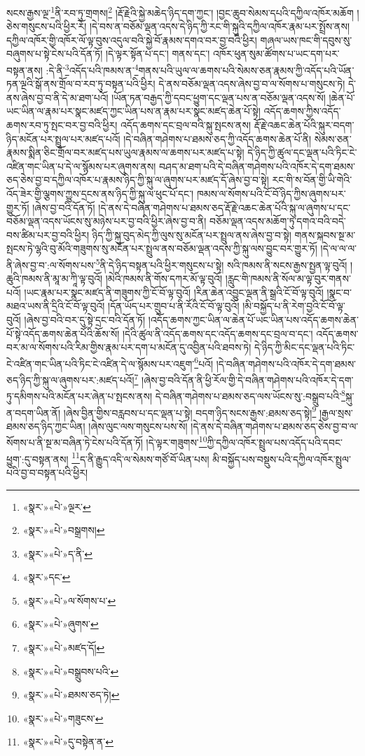 སངས་རྒྱས་ལྔ་\footnote{«སྣར་»«པེ་»ལྔར་}ནི་རབ་ཏུ་གྲགས།\footnote{«སྣར་»«པེ་»བསྒྲགས།} །རྡོ་རྗེའི་སྐྱེ་མཆེད་ཉིད་དག་ཀྱང་། །བྱང་ཆུབ་སེམས་དཔའི་དཀྱིལ་འཁོར་མཆོག །ཅེས་གསུངས་པའི་ཕྱིར་རོ། །དེ་བས་ན་བཅོམ་ལྡན་འདས་དེ་ཉིད་ཀྱི་རང་གི་སྐུའི་དཀྱིལ་འཁོར་རྣམ་པར་སྤྲོས་ནས། དཀྱིལ་འཁོར་གྱི་འཁོར་ལོ་ལྟ་བུས་འདུལ་བའི་སྐྱེ་བོ་རྣམས་དགའ་བར་བྱ་བའི་ཕྱིར། གཞལ་ཡས་ཁང་གི་དབུས་སུ་བཞུགས་པ་སྟེ་ངེས་པའི་དོན་ཏོ། །དེ་ལྟར་སྟོན་པ་དང་། གནས་དང་། འཁོར་ཕུན་སུམ་ཚོགས་པ་ཡང་དག་པར་བསྟན་ནས། :དེ་ནི་\footnote{«སྣར་»«པེ་»ད་ནི་}འདོད་པའི་ཁམས་ན་\footnote{«སྣར་»དང་}གནས་པའི་ཡུལ་ལ་ཆགས་པའི་སེམས་ཅན་རྣམས་ཀྱི་འདོད་པའི་ཡོན་ཏན་ལྔའི་སྒོ་ནས་གྲོལ་བ་རབ་ཏུ་བསྟན་པའི་ཕྱིར། དེ་ནས་བཅོམ་ལྡན་འདས་ཞེས་བྱ་བ་ལ་སོགས་པ་གསུངས་ཏེ། དེ་ནས་ཞེས་བྱ་བ་ནི་དེ་མ་ཐག་པའོ། །ཡོན་ཏན་བརྒྱད་ཀྱི་དབང་ཕྱུག་དང་ལྡན་པས་ན་བཅོམ་ལྡན་འདས་སོ། །ཆེན་པོ་ཡང་ཡིན་ལ་རྣམ་པར་སྣང་མཛད་ཀྱང་ཡིན་པས་ན་རྣམ་པར་སྣང་མཛད་ཆེན་པོ་སྟེ། འདོད་ཆགས་ཀྱིས་འདོད་ཆགས་རབ་ཏུ་སྤང་བར་བྱ་བའི་ཕྱིར། འདོད་ཆགས་དང་བྲལ་བའི་སྐུ་སྤངས་ནས། རྡོ་རྗེ་འཆང་ཆེན་པོའི་སྐུར་བདག་ཉིད་མངོན་པར་སྤྲུལ་པར་མཛད་པའོ། །དེ་བཞིན་གཤེགས་པ་ཐམས་ཅད་ཀྱི་འདོད་ཆགས་ཆེན་པོ་ནི། སེམས་ཅན་རྣམས་སྨིན་ཅིང་གྲོལ་བར་མཛད་པས་ཡུལ་རྣམས་ལ་ཆགས་པར་མཛད་པ་སྟེ། དེ་ཉིད་ཀྱི་ཚུལ་དང་ལྡན་པའི་ཏིང་ངེ་འཛིན་གང་ཡིན་པ་དེ་ལ་སྙོམས་པར་ཞུགས་ནས། བཤད་མ་ཐག་པའི་དེ་བཞིན་གཤེགས་པའི་འཁོར་དེ་དག་ཐམས་ཅད་ཅེས་བྱ་བ་དཀྱིལ་འཁོར་པ་རྣམས་ཉིད་ཀྱི་སྐུ་ལ་ཞུགས་པར་མཛད་དོ་ཞེས་བྱ་བ་སྟེ། རང་གི་ས་བོན་གྱི་ཡི་གེའི་འོད་ཟེར་གྱི་ལྕགས་ཀྱུས་དྲངས་ནས་ཉིད་ཀྱི་སྐུ་ལ་ཕུང་པོ་དང་། ཁམས་ལ་སོགས་པའི་ངོ་བོ་ཉིད་ཀྱིས་ཞུགས་པར་གྱུར་ཏོ། །ཞེས་བྱ་བའི་དོན་ཏོ། །དེ་ནས་དེ་བཞིན་གཤེགས་པ་ཐམས་ཅད་རྡོ་རྗེ་འཆང་ཆེན་པོའི་སྐུ་ལ་ཞུགས་པ་དང་བཅོམ་ལྡན་འདས་ཡོངས་སུ་མཉེས་པར་བྱ་བའི་ཕྱིར་ཞེས་བྱ་བ་ནི། བཅོམ་ལྡན་འདས་མཆོག་ཏུ་དགའ་བའི་བདེ་བས་ཚིམ་པར་བྱ་བའི་ཕྱིར། ཉིད་ཀྱི་སྐུ་བུད་མེད་ཀྱི་ལུས་སུ་མངོན་པར་སྤྲུལ་ནས་ཞེས་བྱ་བ་སྟེ། གནས་སྐབས་སྔ་མ་སྤངས་ཏེ་ལྷའི་བུ་མོའི་གཟུགས་སུ་མངོན་པར་སྤྲུལ་ནས་བཅོམ་ལྡན་འདས་ཀྱི་སྐུ་ལས་བྱུང་བར་གྱུར་ཏོ། །དེ་ལ་ལ་ལ་ནི་ཞེས་བྱ་བ་:ལ་སོགས་པས་\footnote{«སྣར་»«པེ་»ལ་སོགས་པ་}ནི་དེ་ཉིད་བསྟན་པའི་ཕྱིར་གསུངས་པ་སྟེ། སའི་ཁམས་ནི་སངས་རྒྱས་སྤྱན་ལྟ་བུའོ། །ཆུའི་ཁམས་ནི་མཱ་མ་ཀཱི་ལྟ་བུའོ། །མེའི་ཁམས་ནི་གོས་དཀར་མོ་ལྟ་བུའོ། །རླུང་གི་ཁམས་ནི་སོལ་མ་ལྟ་བུར་གནས་པའོ། །ཡང་རྣམ་པར་སྣང་མཛད་ནི་གཟུགས་ཀྱི་ངོ་བོ་ལྟ་བུའོ། །རིན་ཆེན་འབྱུང་ལྡན་ནི་སྒྲའི་ངོ་བོ་ལྟ་བུའོ། །སྣང་བ་མཐའ་ཡས་ནི་དྲིའི་ངོ་བོ་ལྟ་བུའོ། །དོན་ཡོད་པར་གྲུབ་པ་ནི་རོའི་ངོ་བོ་ལྟ་བུའོ། །མི་བསྐྱོད་པ་ནི་རེག་བྱའི་ངོ་བོ་ལྟ་བུའོ། །ཞེས་བྱ་བའི་བར་དུ་སྟེ་དྲང་བའི་དོན་ཏོ། །འདོད་ཆགས་ཀྱང་ཡིན་ལ་ཆེན་པོ་ཡང་ཡིན་པས་འདོད་ཆགས་ཆེན་པོ་སྟེ་འདོད་ཆགས་ཆེན་པོའི་ཆོས་སོ། །དེའི་ཚུལ་ནི་འདོད་ཆགས་དང་འདོད་ཆགས་དང་བྲལ་བ་དང་། འདོད་ཆགས་བར་མ་ལ་སོགས་པའི་རིམ་གྱིས་རྣམ་པར་དག་པ་མངོན་དུ་འབྱིན་པའི་ཐབས་ཏེ། དེ་ཉིད་ཀྱི་མིང་དང་ལྡན་པའི་ཏིང་ངེ་འཛིན་གང་ཡིན་པའི་ཏིང་ངེ་འཛིན་དེ་ལ་སྙོམས་པར་འཇུག་\footnote{«སྣར་»«པེ་»ཞུགས་}པའོ། །དེ་བཞིན་གཤེགས་པའི་འཁོར་དེ་དག་ཐམས་ཅད་ཉིད་ཀྱི་སྐུ་ལ་ཞུགས་པར་:མཛད་པའོ།\footnote{«སྣར་»«པེ་»མཛད་དོ།} །ཞེས་བྱ་བའི་དོན་ནི་ཕྱི་རོལ་གྱི་དེ་བཞིན་གཤེགས་པའི་འཁོར་དེ་དག་ཏུ་དམིགས་པའི་མངོན་པར་ཞེན་པ་སྤངས་ནས། དེ་བཞིན་གཤེགས་པ་ཐམས་ཅད་ལས་ཡོངས་སུ་:བསྒྲུབ་པའི་\footnote{«སྣར་»«པེ་»བསྒྲུབས་པའི་}སྐུ་ན་བདག་ཡིན་ནོ། །ཞེས་བྱིན་གྱིས་བརླབས་པ་དང་ལྡན་པ་སྟེ། བདག་ཉིད་སངས་རྒྱས་:ཐམས་ཅད་སྟེ།\footnote{«སྣར་»«པེ་»ཐམས་ཅད་ཏེ།} །རྒྱལ་སྲས་ཐམས་ཅད་ཉིད་ཀྱང་ཡིན། །ཞེས་ལུང་ལས་གསུངས་པས་སོ། །དེ་ནས་དེ་བཞིན་གཤེགས་པ་ཐམས་ཅད་ཅེས་བྱ་བ་ལ་སོགས་པ་ནི་སྔ་མ་བཞིན་ཏེ་ངེས་པའི་དོན་ཏོ། །དེ་ལྟར་གཟུགས་\footnote{«སྣར་»«པེ་»གཟུངས་}ཀྱི་དཀྱིལ་འཁོར་སྤྲུལ་པས་འདོད་པའི་དབང་ཕྱུག་:དུ་བསྟན་ནས། \footnote{«སྣར་»«པེ་»དུ་བསྟེན་ན་}ད་ནི་རྒྱུད་འདི་ལ་སེམས་གཙོ་བོ་ཡིན་པས། མི་བསྐྱོད་པས་བསྡུས་པའི་དཀྱིལ་འཁོར་སྤྲུལ་པའི་བྱ་བ་བསྟན་པའི་ཕྱིར། 